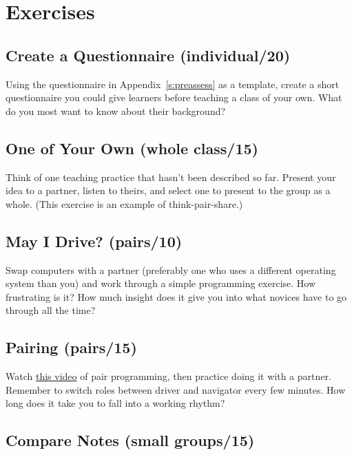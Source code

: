 \section{Exercises}\label{s:classroom-exercises}

\subsection{Create a Questionnaire (individual/20)}\label{create-a-questionnaire-individual20}

Using the questionnaire in Appendix~\ref{s:preassess} as a template,
create a short questionnaire you could give learners before teaching a
class of your own. What do you most want to know about their background?

\subsection{One of Your Own (whole class/15)}\label{one-of-your-own-whole-class15}

Think of one teaching practice that hasn't been described so far.
Present your idea to a partner, listen to theirs, and select one to
present to the group as a whole. (This exercise is an example of
think-pair-share.)

\subsection{May I Drive? (pairs/10)}\label{may-i-drive-pairs10}

Swap computers with a partner (preferably one who uses a different
operating system than you) and work through a simple programming
exercise. How frustrating is it? How much insight does it give you into
what novices have to go through all the time?

\subsection{Pairing (pairs/15)}\label{pairing-pairs15}

Watch \href{https://www.youtube.com/watch?v=vgkahOzFH2Q}{this video} of pair programming, then
practice doing it with a partner. Remember to switch roles between
driver and navigator every few minutes. How long does it take you to
fall into a working rhythm?

\subsection{Compare Notes (small groups/15)}\label{compare-notes-small-groups15}

